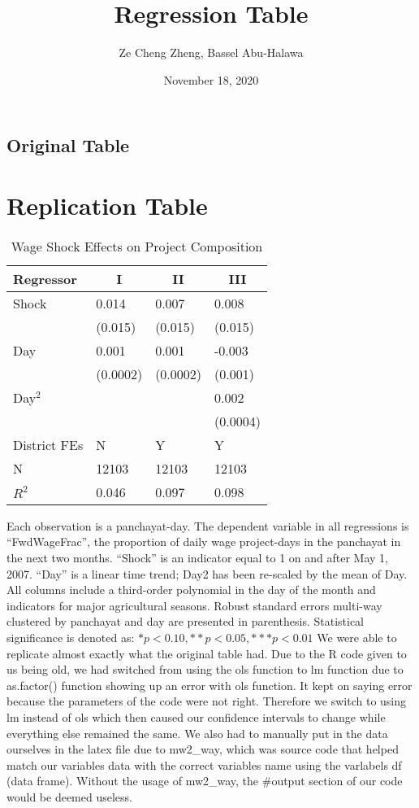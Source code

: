 \documentclass{article}
\title{Regression Table}
\author{Ze Cheng Zheng, Bassel Abu-Halawa}
\date{November 18, 2020}
\begin{document}
\maketitle




\subsection{Original Table} 




\section{Replication Table}
\begin{table}[!htbp] \centering 
  \caption{Wage Shock Effects on Project Composition} 
  \label{} 
\begin{tabular*}{\textwidth}{@{\extracolsep{\fill}}llll}\hline\hline
\multicolumn{1}{l}{Regressor}&\multicolumn{1}{c}{I}&\multicolumn{1}{c}{II}&\multicolumn{1}{c}{III}\tabularnewline
\hline
Shock&0.014$^{}$&0.007$^{}$&0.008$^{}$\tabularnewline
&{\scriptsize (0.015)}&{\scriptsize (0.015)}&{\scriptsize (0.015)}\tabularnewline
Day&0.001$^{}$&0.001$^{}$&-0.003$^{}$\tabularnewline
&{\scriptsize (0.0002)}&{\scriptsize (0.0002)}&{\scriptsize (0.001)}\tabularnewline
Day$^2$&&&0.002$^{}$\tabularnewline
&&&{\scriptsize (0.0004)}\tabularnewline
District FEs&N&Y&Y\tabularnewline
N&12103&12103&12103\tabularnewline
$R^2$&0.046&0.097&0.098\tabularnewline
\hline
\end{tabular*}
\end{table}
Each observation is a panchayat-day. The dependent variable in all regressions is “FwdWageFrac”, the proportion of daily wage project-days in the panchayat in the next two months. “Shock” is an indicator equal to 1 on and after May 1, 2007. “Day” is a linear time trend; Day2 has been re-scaled by the mean of Day. All columns include a third-order polynomial in the day of the month and indicators for major agricultural seasons. Robust standard errors multi-way clustered by panchayat and day are presented in parenthesis. 
\newline
Statistical significance is denoted as: $*p < 0.10, **p < 0.05, ***p < 0.01$
\newline
\newline
We were able to replicate almost exactly what the original table had. Due to the R code given to us being old, we had switched from using the ols function to lm function due to as.factor() function showing up an error with ols function. It kept on saying error because the parameters of the code were not right. Therefore we switch to using lm instead of ols which then caused our confidence intervals to change while everything else remained the same.  We also had to manually put in the data ourselves in the latex file due to mw2\_way, which was source code that helped match our variables data with the correct variables name using the varlabels df (data frame). Without the usage of mw2\_way, the \#output section of our code would be deemed useless. 
\end{document}
